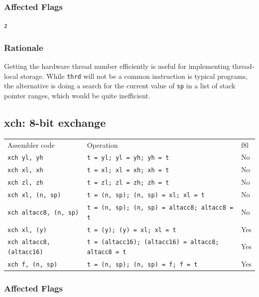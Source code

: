 \documentclass{book}
\begin{document}
\subsubsection*{Affected Flags}

\texttt{z}

\subsubsection*{Rationale}

Getting the hardware thread number efficiently is useful for implementing thread-local storage. While \texttt{thrd} will not be a common instruction is typical programs, the alternative is doing a search for the current value of \texttt{sp} in a list of stack pointer ranges, which would be quite inefficient.


\subsection{xch: 8-bit exchange}

\begin{tabular}{l l l}
Assembler code                   & Operation                                                  & f8l \\
\texttt{xch yl, yh}              & \texttt{t = yl; yl = yh; yh = t}                           & No \\
\texttt{xch xl, xh}              & \texttt{t = xl; xl = xh; xh = t}                           & No \\
\texttt{xch zl, zh}              & \texttt{t = zl; zl = zh; zh = t}                           & No \\
\texttt{xch xl, (n, sp)}         & \texttt{t = (n, sp); (n, sp) = xl; xl = t}                 & No \\
\texttt{xch altacc8, (n, sp)}    & \texttt{t = (n, sp); (n, sp) = altacc8; altacc8 = t}       & No \\
\texttt{xch xl, (y)}             & \texttt{t = (y); (y) = xl; xl = t}                         & Yes \\
\texttt{xch altacc8, (altacc16)} & \texttt{t = (altacc16); (altacc16) = altacc8; altacc8 = t} & Yes \\
\texttt{xch f, (n, sp)}          & \texttt{t = (n, sp); (n, sp) = f; f = t}                   & Yes
\end{tabular}

\subsubsection*{Affected Flags}
\end{document}
